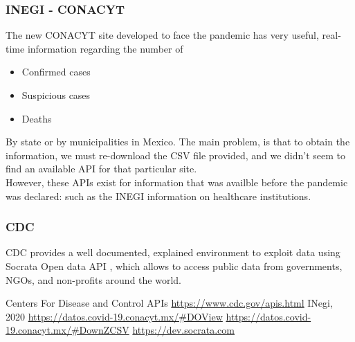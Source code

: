 \documentclass[12pt]{article}
\begin{document}
	\subsubsection{INEGI - CONACYT}
	The new CONACYT site developed \cite{conacyt-dw} to face the pandemic has very useful, real-time information regarding the number of
	\begin{itemize}
		\item Confirmed cases
		\item Suspicious cases
		\item Deaths
	\end{itemize}

	By state or by municipalities in Mexico. The main problem, is that to obtain the information, we must re-download the CSV file provided, and we didn't seem to find an available API for that particular site.\\
	However, these APIs exist for information that was availble before the pandemic was declared: such as the INEGI information on healthcare institutions. 
	\subsubsection{CDC}
	CDC provides a well documented, explained environment to exploit data using Socrata Open data API \cite{devsocrata}, which allows to access public data from governments, NGOs, and non-profits around the world. 

	\begin{thebibliography}{99}
		 Centers For Disease and Control APIs \url{https://www.cdc.gov/apis.html}
		 INegi, 2020 \url{https://datos.covid-19.conacyt.mx/#DOView}
		 \url{https://datos.covid-19.conacyt.mx/#DownZCSV}
		 \url{https://dev.socrata.com}
	\end{thebibliography}
\end{document}
